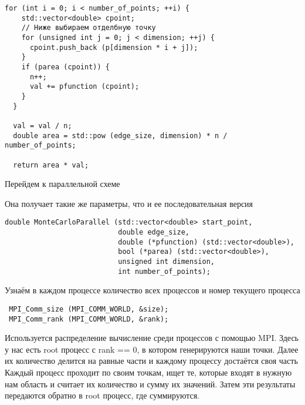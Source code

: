 \documentclass{report}
\begin{document}
\begin{lstlisting}  
for (int i = 0; i < number_of_points; ++i) {
    std::vector<double> cpoint;
    // Ниже выбираем отделбную точку
    for (unsigned int j = 0; j < dimension; ++j) {
      cpoint.push_back (p[dimension * i + j]);
    }
    if (parea (cpoint)) {
      n++;
      val += pfunction (cpoint);
    }
  }

  val = val / n;
  double area = std::pow (edge_size, dimension) * n / number_of_points;

  return area * val;
  \end{lstlisting}
\par Перейдем к параллельной схеме
\par Она получает такие же параметры, что и ее последовательная версия
\begin{lstlisting}
double MonteCarloParallel (std::vector<double> start_point,
                           double edge_size,
                           double (*pfunction) (std::vector<double>),
                           bool (*parea) (std::vector<double>),
                           unsigned int dimension,
                           int number_of_points);
\end{lstlisting}
Узнаём в каждом процессе количество всех процессов и номер текущего процесса
 \begin{lstlisting}
 MPI_Comm_size (MPI_COMM_WORLD, &size);
 MPI_Comm_rank (MPI_COMM_WORLD, &rank);
 \end{lstlisting} Используется распределение вычисление среди процессов с помощью MPI. Здесь у нас есть root процесс с rank == 0, в котором генерируются наши точки. Далее их количество делится на равные части и каждому процессу достаётся своя часть Каждый процесс проходит по своим точкам, ищет те, которые входят в нужную нам область и считает их количество и сумму их значений.
Затем эти результаты передаются обратно в root процесс, где суммируются.
\end{document}
